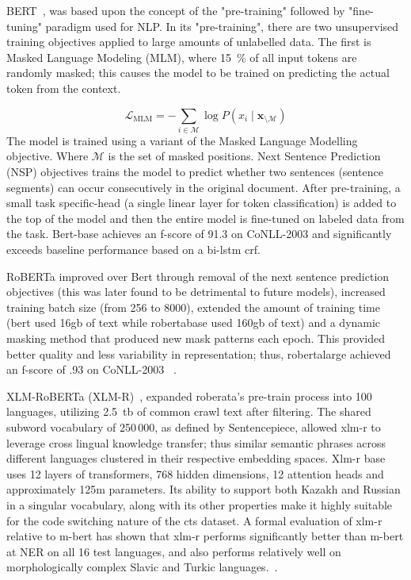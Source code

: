 BERT~\cite{devlin2019bert}, was based upon the concept of the "pre-training" followed by "fine-tuning" paradigm used for NLP. In its "pre-training", there are two unsupervised training objectives applied to large amounts of unlabelled data. The first is Masked Language Modeling (MLM), where 15 \,\% of all input tokens are randomly masked; this causes the model to be trained on predicting the actual token from the context.


\begin{equation}
  \mathcal{L}_\text{MLM} = -\sum_{i \in \mathcal{M}} \log P(x_i \mid \mathbf{x}_{\setminus \mathcal{M}})
\end{equation}
The model is trained using a variant of the Masked Language Modelling objective. Where $\mathcal{M}$ is the set of masked positions. 
Next Sentence Prediction (NSP) objectives trains the model to predict whether two sentences (sentence segments) can occur consecutively in the original document. 
After pre-training, a small task specific-head (a single linear layer for token classification) is added to the top of the model and then the entire model is fine-tuned on labeled data from the task. 
Bert-base achieves an f-score of 91.3 on CoNLL-2003 and significantly exceeds baseline performance based on a bi-lstm crf. 


RoBERTa improved over Bert through removal of the next sentence prediction objectives (this was later found to be detrimental to future models), increased training batch size (from 256 to 8000), extended the amount of training time (bert used 16gb of text while robertabase used 160gb of text) and a dynamic masking method that produced new mask patterns each epoch. 
This provided better quality and less variability in representation; thus, robertalarge achieved an f-score of .93 on CoNLL-2003 ~\cite{keraghel2024survey}.


XLM-RoBERTa (XLM-R)~\cite{conneau2020xlmr}, expanded roberata's pre-train process into 100 languages, utilizing 2.5~tb of common crawl text after filtering. 
The shared subword vocabulary of 250\,000, as defined by Sentencepiece, allowed xlm-r to leverage cross lingual knowledge transfer; thus similar semantic phrases across different languages clustered in their respective embedding spaces. Xlm-r base uses 12 layers of transformers, 768 hidden dimensions, 12 attention heads and approximately 125m parameters. 
Its ability to support both Kazakh and Russian in a singular vocabulary, along with its other properties make it highly suitable for the code switching nature of the cts dataset.
A formal evaluation of xlm-r relative to m-bert has shown that xlm-r performs significantly better than m-bert at NER on all 16 test languages, and also performs relatively well on morphologically complex Slavic and Turkic languages.~\cite{conneau2020xlmr}.


